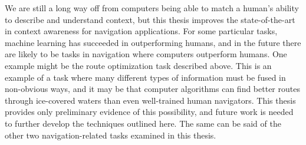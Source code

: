 We are still a long way off from computers being able to match a human's ability to describe and understand context, but this thesis improves the state-of-the-art in context awareness for navigation applications. For some particular tasks, machine learning has succeeded in outperforming humans, and in the future there are likely to be tasks in navigation where computers outperform humans. One example might be the route optimization task described above. This is an example of a task where many different types of information must be fused in non-obvious ways, and it may be that computer algorithms can find better routes through ice-covered waters than even well-trained human navigators. This thesis provides only preliminary evidence of this possibility, and future work is needed to further develop the techniques outlined here. The same can be said of the other two navigation-related tasks examined in this thesis.